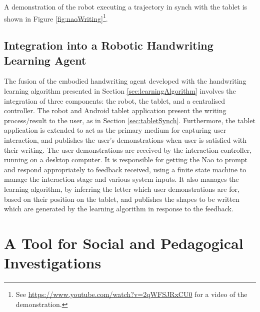 \documentclass{sig-alternate}
\begin{document}
A demonstration of the robot executing a trajectory in synch with the tablet is
shown in Figure \ref{fig:naoWriting}\footnote{See
\url{https://www.youtube.com/watch?v=2qWFSJRxCU0} for a video of the
demonstration. }. %
%
%


\subsection{Integration into a Robotic Handwriting Learning Agent}

The fusion of the embodied handwriting agent developed with the handwriting
learning algorithm presented in Section \ref{sec:learningAlgorithm} involves the
integration of three components: the robot, the tablet, and a centralised controller. %
%
%
The robot and Android tablet application present the writing process/result to
the user, as in Section \ref{sec:tabletSynch}. Furthermore, the tablet
application is extended to act as the primary medium for capturing user
interaction, and publishes the user's demonstrations when user is satisfied with
their writing. The user demonstrations are received by the interaction
controller, running on a desktop computer. It is responsible for getting the Nao
to prompt and respond appropriately to feedback received, using a finite state
machine to manage the interaction stage and various system inputs. It also
manages the learning algorithm, by inferring the letter which user
demonstrations are for, based on their position on the tablet, and publishes the
shapes to be written which are generated by the learning algorithm in response
to the feedback.  





\section{A Tool for Social and Pedagogical Investigations} \label{sec:experiment}
\label{sec4}
\end{document}
